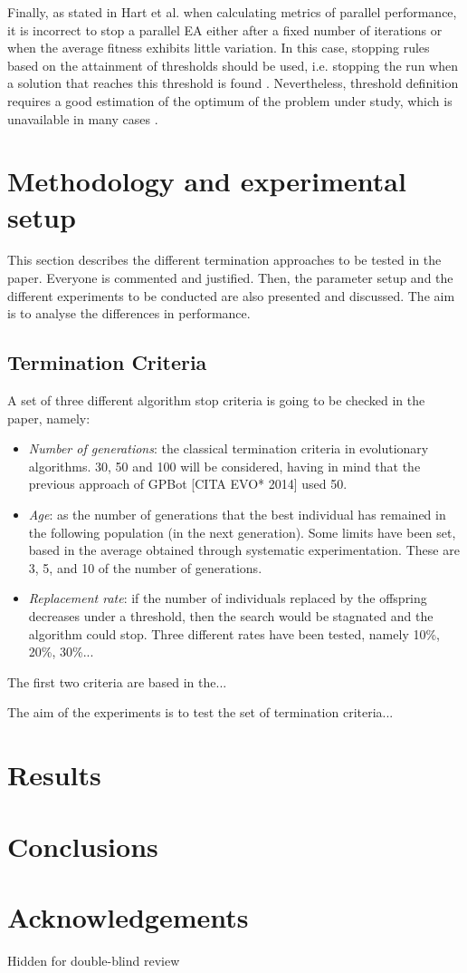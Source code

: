 \documentclass[runningheads,a4paper]{llncs}
\begin{document}
Finally, as stated in Hart et al. \cite{Hart1996} when calculating metrics of parallel performance, it is incorrect to stop a parallel EA either after a fixed number of iterations or when the average fitness exhibits little variation. In this case, stopping rules based on the attainment of thresholds should be used, i.e. stopping the run when a solution that reaches this threshold is found \cite{Sena2001}. Nevertheless, threshold definition requires a good estimation of the optimum of the problem under study, which is unavailable in many cases \cite{Safe2004}.



\section{Methodology and experimental setup}
\label{sec:met}

This section describes the different termination approaches to be tested in the paper. Everyone is commented and justified.
Then, the parameter setup and the different experiments to be conducted are also presented and discussed. The aim is to analyse the differences in performance.

\subsection{Termination Criteria}
A set of three different algorithm stop criteria is going to be checked in the paper, namely:
\begin{itemize}
    \item \textit{Number of generations}: the classical termination criteria in evolutionary algorithms. 30, 50 and 100 will be considered, having in mind that the previous approach of GPBot [CITA EVO* 2014] used 50.
    \item \textit{Age}: as the number of generations that the best individual has remained in the following population (in the next generation). Some limits have been set, based in the average obtained through systematic experimentation. These are 3, 5, and 10 of the number of generations.
    \item \textit{Replacement rate}: if the number of individuals replaced by the offspring decreases under a threshold, then the search would be stagnated and the algorithm could stop. Three different rates have been tested, namely 10\%, 20\%, 30\%...
\end{itemize}

The first two criteria are based in the...

The aim of the experiments is to test the set of termination criteria...


\section{Results}
\label{sec:res}

\section{Conclusions}

\section*{Acknowledgements}

Hidden for double-blind review



\end{document}
